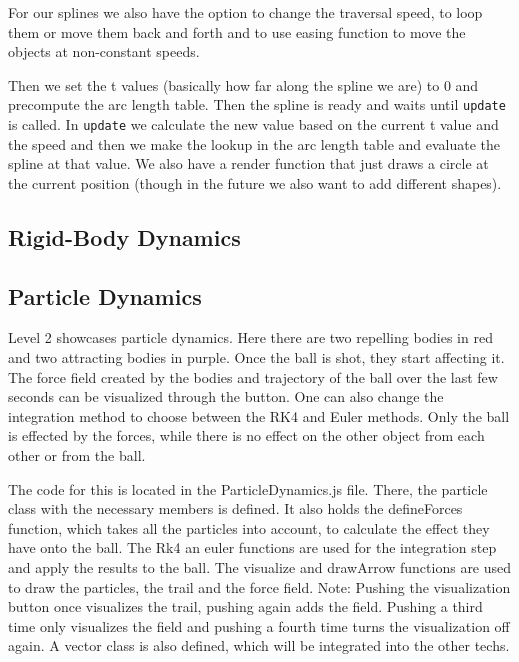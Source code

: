 \documentclass{article}
\begin{document}
For our splines we also have the option to change the traversal speed, to loop them or move them back and forth and 
to use easing function to move the objects at non-constant speeds.

Then we set the t values (basically how far along the spline we are) to $0$ and 
precompute the arc length table. Then the spline is ready and waits until \texttt{update} is called. 
In \texttt{update} we calculate the new value based on the current t value and the speed and then we make the 
lookup in the arc length table and evaluate the spline at that value. We also have a render function 
that just draws a circle at the current position (though in the future we also want to add different shapes).

\subsection{Rigid-Body Dynamics}

\subsection{Particle Dynamics}
Level 2 showcases particle dynamics. Here there are two repelling bodies in red and two attracting bodies in purple. Once the ball is shot, they start affecting it. The force field created by the bodies and trajectory of the ball over the last few seconds can be visualized through the button. One can also change the integration method to choose between the RK4 and Euler methods. Only the ball is effected by the forces, while there is no effect on the other object from each other or from the ball.  \newline

The code for this is located in the ParticleDynamics.js file. There, the particle class with the necessary members is defined. It also holds the defineForces function, which takes all the particles into account, to calculate the effect they have onto the ball. The Rk4 an euler functions are used for the integration step and apply the results to the ball. The visualize and drawArrow functions are used to draw the particles, the trail and the force field. 
Note: Pushing the visualization button once visualizes the trail, pushing again adds the field. Pushing a third time only visualizes the field and pushing a fourth time turns the visualization off again. 
A vector class is also defined, which will be integrated into the other techs. 
\end{document}
